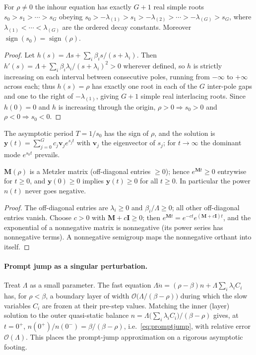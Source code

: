 \begin{theorem}
\label{thm:interlacing}
For $\rho\ne0$ the inhour equation has exactly $G+1$ real simple roots
$s_0>s_1>\cdots>s_G$ obeying
$s_0>-\lambda_{(1)}>s_1>-\lambda_{(2)}>\cdots>-\lambda_{(G)}>s_G$, where
$\lambda_{(1)}<\cdots<\lambda_{(G)}$ are the ordered decay constants. Moreover
$\operatorname{sign}(s_0)=\operatorname{sign}(\rho)$.
\end{theorem}
\begin{proof}
Let $h(s)=\Lambda s+\sum_i\beta_i s/(s+\lambda_i)$. Then
$h'(s)=\Lambda+\sum_i\beta_i\lambda_i/(s+\lambda_i)^2>0$ wherever defined, so $h$
is strictly increasing on each interval between consecutive poles, running from
$-\infty$ to $+\infty$ across each; thus $h(s)=\rho$ has exactly one root in each of
the $G$ inter-pole gaps and one to the right of $-\lambda_{(1)}$, giving $G+1$
simple real interlacing roots. Since $h(0)=0$ and $h$ is increasing through the
origin, $\rho>0\Rightarrow s_0>0$ and $\rho<0\Rightarrow s_0<0$.
\end{proof}

\begin{corollary}
The asymptotic period $T=1/s_0$ has the sign of $\rho$, and the solution is
$\mathbf y(t)=\sum_{j=0}^{G}c_j\mathbf v_j e^{s_j t}$ with $\mathbf v_j$ the
eigenvector of $s_j$; for $t\to\infty$ the dominant mode $e^{s_0 t}$ prevails.
\end{corollary}

\begin{proposition}
\label{prop:metzler}
$\mathbf M(\rho)$ is a Metzler matrix (off-diagonal entries $\ge0$); hence
$e^{\mathbf M t}\ge0$ entrywise for $t\ge0$, and $\mathbf y(0)\ge0$ implies
$\mathbf y(t)\ge0$ for all $t\ge0$. In particular the power $n(t)$ never goes
negative.
\end{proposition}
\begin{proof}
The off-diagonal entries are $\lambda_i\ge0$ and $\beta_i/\Lambda\ge0$; all other
off-diagonal entries vanish. Choose $c>0$ with $\mathbf M+c\mathbf I\ge0$; then
$e^{\mathbf M t}=e^{-ct}e^{(\mathbf M+c\mathbf I)t}$, and the exponential of a
nonnegative matrix is nonnegative (its power series has nonnegative terms). A
nonnegative semigroup maps the nonnegative orthant into itself.
\end{proof}

\paragraph{Prompt jump as a singular perturbation.}
Treat $\Lambda$ as a small parameter. The fast equation
$\Lambda\dot n=(\rho-\beta)n+\Lambda\sum_i\lambda_i C_i$ has, for $\rho<\beta$, a
boundary layer of width $\mathcal O\!\big(\Lambda/(\beta-\rho)\big)$ during which
the slow variables $C_i$ are frozen at their pre-step values. Matching the inner
(layer) solution to the outer quasi-static balance
$n=\Lambda\big(\sum_i\lambda_iC_i\big)/(\beta-\rho)$ gives, at $t=0^+$,
$n(0^+)/n(0^-)=\beta/(\beta-\rho)$, i.e.\ \eqref{eq:promptjump}, with relative error
$\mathcal O(\Lambda)$. This places the prompt-jump approximation on a rigorous
asymptotic footing.


